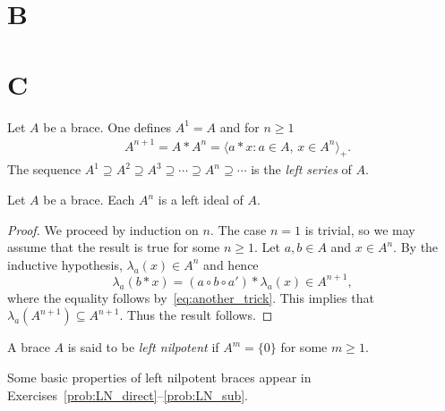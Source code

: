 \section*{B}


\section*{C}


\begin{definition}
Let $A$ be a brace. One defines
$A^1=A$ and for $n\geq1$
\begin{align*}
    & A^{n+1}=A*A^{n}=\langle a*x: a\in A,\,x\in A^{n}\rangle_+.
\end{align*}
The sequence $A^1\supseteq A^2\supseteq A^3\supseteq\cdots\supseteq A^n\supseteq\cdots$
is the \emph{left series} of $A$.
\end{definition}

\begin{proposition}
    \label{pro:left_series}
    Let $A$ be a brace. Each $A^{n}$ is a left ideal of $A$.
\end{proposition}

\begin{proof}
    We proceed by induction on $n$. The case $n=1$ is trivial, so we may assume
    that the result is true for some $n\geq1$. Let $a,b\in A$ and $x\in A^n$.
    By the inductive hypothesis, $\lambda_a(x)\in A^n$ and hence
    \[
        \lambda_a(b*x)=(a\circ b\circ a')*\lambda_a(x)\in A^{n+1},
    \]
where the equality follows by~\eqref{eq:another_trick}. This implies
that $\lambda_a(A^{n+1})\subseteq A^{n+1}$. Thus the result
follows.
\end{proof}

\begin{definition}
    A brace $A$ is said to be \emph{left nilpotent} if $A^{m}=\{0\}$ for some
    $m\geq1$.
\end{definition}

Some basic properties of left nilpotent braces appear in Exercises~\ref{prob:LN_direct}--\ref{prob:LN_sub}. 

    
